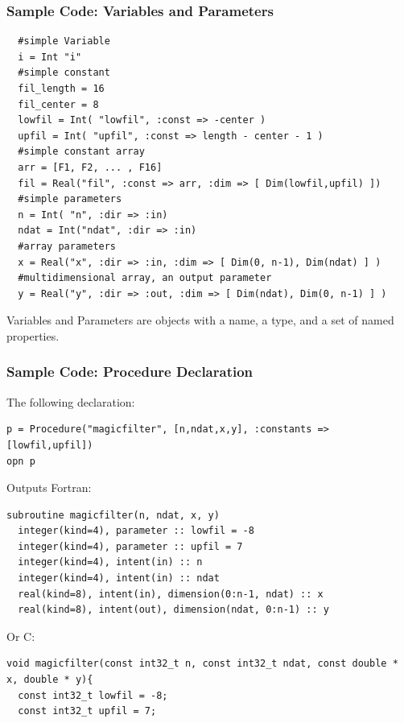 \documentclass{beamer}
\begin{document}
\begin{frame}[fragile]
\frametitle{Sample Code: Variables and Parameters}
\tiny
\lstset{style=BOAST}
\begin{lstlisting}
  #simple Variable
  i = Int "i"
  #simple constant
  fil_length = 16
  fil_center = 8  
  lowfil = Int( "lowfil", :const => -center )
  upfil = Int( "upfil", :const => length - center - 1 )
  #simple constant array
  arr = [F1, F2, ... , F16]
  fil = Real("fil", :const => arr, :dim => [ Dim(lowfil,upfil) ])
  #simple parameters
  n = Int( "n", :dir => :in)
  ndat = Int("ndat", :dir => :in)
  #array parameters
  x = Real("x", :dir => :in, :dim => [ Dim(0, n-1), Dim(ndat) ] )
  #multidimensional array, an output parameter
  y = Real("y", :dir => :out, :dim => [ Dim(ndat), Dim(0, n-1) ] )
\end{lstlisting}
\normalsize
Variables and Parameters are objects with a name, a type, and a set of named properties.
\end{frame}

\begin{frame}[fragile]
\frametitle{Sample Code: Procedure Declaration}
The following declaration:
\tiny
\lstset{style=BOAST}
\begin{lstlisting}
p = Procedure("magicfilter", [n,ndat,x,y], :constants => [lowfil,upfil])
opn p
\end{lstlisting}
\normalsize 
Outputs Fortran:
\tiny
\lstset{style=BFortran}
\begin{lstlisting}
subroutine magicfilter(n, ndat, x, y)
  integer(kind=4), parameter :: lowfil = -8
  integer(kind=4), parameter :: upfil = 7
  integer(kind=4), intent(in) :: n
  integer(kind=4), intent(in) :: ndat
  real(kind=8), intent(in), dimension(0:n-1, ndat) :: x
  real(kind=8), intent(out), dimension(ndat, 0:n-1) :: y
\end{lstlisting}
\normalsize
Or C:
\tiny
\lstset{style=BC}
\begin{lstlisting}
void magicfilter(const int32_t n, const int32_t ndat, const double * x, double * y){
  const int32_t lowfil = -8;
  const int32_t upfil = 7;
\end{lstlisting}
\end{frame}
\end{document}

